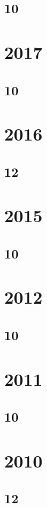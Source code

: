 \subsection{10}

\section{2017}
\subsection{10}



\section{2016}
\subsection{12}


\section{2015}
\subsection{10}

\section{2012}
\subsection{10}


\section{2011}
\subsection{10}



\section{2010}
\subsection{12}


% 

\fi
 
